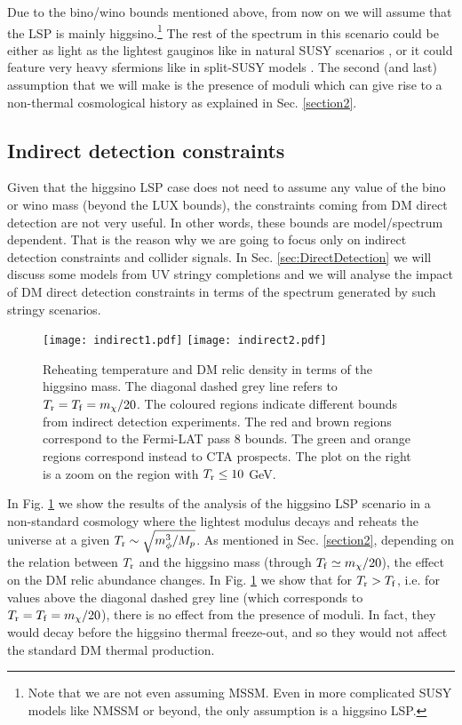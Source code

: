 \documentclass[11pt,a4paper]{article}
\begin{document}
Due to the bino/wino bounds mentioned above, from now on we will assume that the LSP is mainly higgsino.\footnote{Note that we are not even assuming MSSM. Even in more complicated SUSY models like NMSSM or beyond, the only assumption is a higgsino LSP.} The rest of the spectrum in this scenario could be either as light as the lightest gauginos like in natural SUSY scenarios \cite{Hall:2011aa}, or it could feature very heavy sfermions like in split-SUSY models \cite{Wells:2003tf}. The second (and last) assumption that we will make is the presence of moduli which can give rise to a non-thermal cosmological history as explained in Sec. \ref{section2}.


\subsection{Indirect detection constraints}

Given that the higgsino LSP case does not need to assume any value of the bino or wino mass (beyond the LUX bounds), the constraints coming from DM direct detection are not very useful. In other words, these bounds are model/spectrum dependent. That is the reason why we are going to focus only on indirect detection constraints and collider signals. In Sec. \ref{sec:DirectDetection} we will discuss some models from UV stringy completions and we will analyse the impact of DM direct detection constraints in terms of the spectrum generated by such stringy scenarios.

\begin{figure}[!t]
\centering
\hspace{-0.5cm}
\texttt{[image: indirect1.pdf]}
\hspace{-0.1cm}
\texttt{[image: indirect2.pdf]}
\hspace{-0.5cm}
\caption{Reheating temperature and DM relic density in terms of the higgsino mass. The diagonal dashed grey line refers to $T_{\rm r} = T_{\rm f} = m_\chi/20$. The coloured regions indicate different bounds from indirect detection experiments. The red and brown regions correspond to the Fermi-LAT pass 8 bounds. The green and orange regions correspond instead to CTA prospects. The plot on the right is a zoom on the region with $T_{\rm r}\leq10$ GeV.}
\label{figInd}
\end{figure}


In Fig. \ref{figInd} we show the results of the analysis of the higgsino LSP scenario in a non-standard cosmology where the lightest modulus decays and reheats the universe at a given $T_{\rm r} \sim \sqrt{m_\phi^3/M_p}$. As mentioned in Sec. \ref{section2}, depending on the relation between $T_{\rm r}$ and the higgsino mass (through $T_{\rm f} \simeq m_\chi/20$), the effect on the DM relic abundance changes. In Fig. \ref{figInd} we show that for $T_{\rm r} > T_{\rm f}$, i.e. for values above the diagonal dashed grey line (which corresponds to $T_{\rm r} = T_{\rm f}  = m_\chi/20$), there is no effect from the presence of moduli. In fact, they would decay before the higgsino thermal freeze-out, and so they would not affect the standard DM thermal production.
\end{document}
